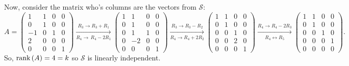 Now, consider the matrix who's columns are the vectors from $\mathcal{S}$:
\[
    A = \begin{pmatrix}
        1 & 1 & 0 & 0 \\
        0 & 1 & 0 & 0 \\
        -1 & 0 & 1 & 0 \\
        2 & 0 & 0 & 0 \\
        0 & 0 & 0 & 1
    \end{pmatrix}
    \xrightarrow[R_4\to\,R_4 - 2R_1]{R_3 \to R_3 + R_1}
    \begin{pmatrix}
        1 & 1 & 0 & 0 \\
        0 & 1 & 0 & 0 \\
        0 & 1 & 1 & 0 \\
        0 & -2 & 0 & 0 \\
        0 & 0 & 0 & 1
    \end{pmatrix}
    \xrightarrow[R_4 \to R_4 + 2R_2]{R_3 \to R_3 - R_2}
    \begin{pmatrix}
        1 & 1 & 0 & 0 \\
        0 & 1 & 0 & 0 \\
        0 & 0 & 1 & 0 \\
        0 & 0 & 2 & 0 \\
        0 & 0 & 0 & 1
    \end{pmatrix}
    \xrightarrow[R_4 \leftrightarrow R_5]{R_4 \to R_4 - 2R_3}
    \begin{pmatrix}
        1 & 1 & 0 & 0 \\
        0 & 1 & 0 & 0 \\
        0 & 0 & 1 & 0 \\
        0 & 0 & 0 & 1 \\
        0 & 0 & 0 & 0
    \end{pmatrix}.
\]
So, $\text{rank}\left(A\right) = 4 = k$ so $\mathcal{S}$ is linearly independent.

